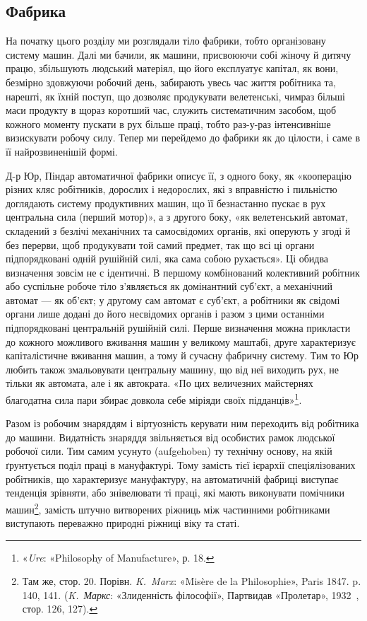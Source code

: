 \subsection{Фабрика}

На початку цього розділу ми розглядали тіло фабрики, тобто
організовану систему машин. Далі ми бачили, як машини, присвоюючи
собі жіночу й дитячу працю, збільшують людський
матеріял, що його експлуатує капітал, як вони, безмірно здовжуючи
робочий день, забирають увесь час життя робітника та,
нарешті, як їхній поступ, що дозволяє продукувати велетенські,
чимраз більші маси продукту в щораз коротший час, служить
систематичним засобом, щоб кожного моменту пускати в рух
більше праці, тобто раз-у-раз інтенсивніше визискувати робочу
силу. Тепер ми перейдемо до фабрики як до цілости, і саме в її
найрозвиненішій формі.

Д-р Юр, Піндар автоматичної фабрики описує її, з одного
боку, як «кооперацію різних кляс робітників, дорослих і недорослих,
які з вправністю і пильністю доглядають систему продуктивних
машин, що її безнастанно пускає в рух центральна
сила (перший мотор)», а з другого боку, «як велетенський автомат,
складений з безлічі механічних та самосвідомих органів,
які оперують у згоді й без перерви, щоб продукувати той самий
предмет, так що всі ці органи підпорядковані одній рушійній
силі, яка сама собою рухається». Ці обидва визначення зовсім
не є ідентичні. В першому комбінований колективний робітник
або суспільне робоче тіло з’являється як домінантний суб’єкт,
а механічний автомат — як об’єкт; у другому сам автомат є
суб’єкт, а робітники як свідомі органи лише додані до його
несвідомих органів і разом з цими останніми підпорядковані
центральній рушійній силі. Перше визначення можна прикласти
до кожного можливого вживання машин у великому маштабі,
друге характеризує капіталістичне вживання машин, а тому й
сучасну фабричну систему. Тим то Юр любить також змальовувати
центральну машину, що від неї виходить рух, не тільки як
автомата, але і як автократа. «По цих величезних майстернях
благодатна сила пари збирає довкола себе міріяди своїх підданців»\footnote{
«\emph{Ure}: «Philosophy of Manufacture», р. 18.
}.

Разом із робочим знаряддям і віртуозність керувати ним
переходить від робітника до машини. Видатність знаряддя звільняється
від особистих рамок людської робочої сили. Тим самим
усунуто (aufgehoben) ту технічну основу, на якій ґрунтується
поділ праці в мануфактурі. Тому замість тієї ієрархії спеціялізованих
робітників, що характеризує мануфактуру, на автоматичній
фабриці виступає тенденція зрівняти, або знівелювати ті
праці, які мають виконувати помічники машин\footnote{
Там же, стор. 20. Порівн. \emph{K.~Marx}: «Misère de la Philosophie»,
Paris 1847. p. 140, 141. (\emph{K.~Маркс}: «Злиденність філософії», Партвидав
«Пролетар», 1932~, стор. 126, 127).
}, замість штучно
витворених ріжниць між частинними робітниками виступають
переважно природні ріжниці віку та статі.

